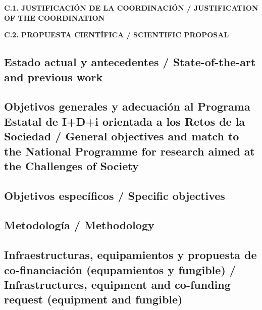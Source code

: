 \documentclass[a4paper,11pt,oneside]{article}
\begin{document}
\vspace{12pt}

\noindent\textbf{C.1. JUSTIFICACIÓN DE LA COORDINACIÓN / JUSTIFICATION OF THE COORDINATION}
\vspace{12pt}

%

\vspace{12pt}

\noindent\textbf{C.2. PROPUESTA CIENTÍFICA / SCIENTIFIC PROPOSAL}

\subsection*{\label{subsubsec:stateoftheart}Estado actual y antecedentes /  State-of-the-art and previous work}



\subsection*{Objetivos generales y adecuación al Programa Estatal de I+D+i orientada a los Retos de la Sociedad / General objectives and match to the National Programme for research aimed at the Challenges of Society}



\subsection*{Objetivos específicos / Specific objectives}
%





\subsection*{Metodolog\'ia / Methodology}


 

 

\subsection*{Infraestructuras, equipamientos y propuesta de co-financiaci\'on (equpamientos y fungible) / Infrastructures, equipment and co-funding request (equipment and fungible)}
\end{document}
